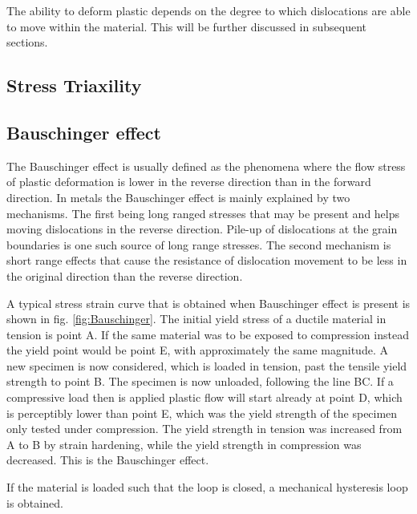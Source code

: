 \documentclass{article}
\begin{document}
The ability to deform plastic depends on the degree to which dislocations are able to move within the material. This will be further discussed in subsequent sections. 

\subsection{Stress Triaxility}
\subsection{Bauschinger effect}



The Bauschinger effect is usually defined as the phenomena where the flow stress of plastic deformation is lower in the reverse direction than in the forward direction. In metals the Bauschinger effect is mainly explained by two mechanisms. The first being long ranged stresses that may be present and helps moving dislocations in the reverse direction. Pile-up of dislocations at the grain boundaries is one such source of long range stresses. The second mechanism is short range effects that cause the resistance of dislocation movement to be less in the original direction than the reverse direction. 

A typical stress strain curve that is obtained when Bauschinger effect is present is shown in fig. \ref{fig:Bauschinger}. The initial yield stress of a ductile material in tension is point A. If the same material was to be exposed to compression instead the yield point would be point E, with approximately the same magnitude. A new specimen is now considered, which is loaded in tension, past the tensile yield strength to point B. The specimen is now unloaded, following the line BC. If a compressive load then is applied plastic flow will start already at point D, which is perceptibly lower than point E, which was the yield strength of the specimen only tested under compression. The yield strength in tension was increased from A to B by strain hardening, while the yield strength in compression was decreased. This is the Bauschinger effect. 

If the material is loaded such that the loop is closed, a mechanical hysteresis loop is obtained.
\end{document}
